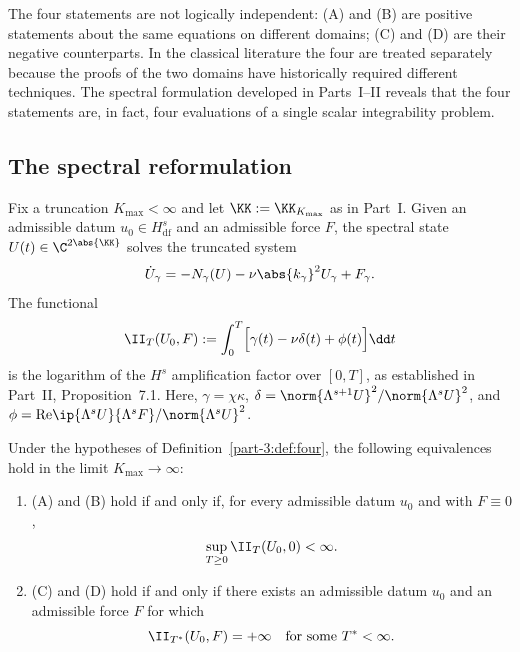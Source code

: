 \begin{remark}\label{part-3:rem:four-structure}
The four statements are not logically independent: (A) and (B) are 
positive statements about the same equations on different domains; 
(C) and (D) are their negative counterparts. In the classical 
literature the four are treated separately because the proofs of the 
two domains have historically required different techniques. The 
spectral formulation developed in Parts~I--II reveals that the four 
statements are, in fact, four evaluations of a single scalar 
integrability problem.
\end{remark}

\subsection{The spectral reformulation}
\label{part-3:ssec:spectral-reform}

Fix a truncation $K_{\max}<\infty$ and let $\KK := \KK_{K_{\max}}$ as 
in Part~I. Given an admissible datum $u_0\in H^s_{\mathrm{df}}$ and 
an admissible force $F$, the spectral state 
$U(t)\in\C^{2\abs{\KK}}$ solves the truncated system
\begin{equation}\label{part-3:eq:spectral-trunc}
\dot U_\gamma = -N_\gamma(U) - \nu\abs{k_\gamma}^2 U_\gamma + F_\gamma.
\end{equation}
The functional
\begin{equation}\label{part-3:eq:master-functional}
\II_{T}(U_0,F) := \int_0^{T}\Bigl[\gamma(t) - \nu\delta(t) + \phi(t)\Bigr]\dd t
\end{equation}
is the logarithm of the $H^s$ amplification factor over $[0,T]$, as 
established in Part~II, Proposition~7.1. Here, $\gamma = \chi\kappa$, 
$\delta = \norm{\Lambda^{s+1}U}^2/\norm{\Lambda^s U}^2$, and 
$\phi = \mathrm{Re}\ip{\Lambda^s U}{\Lambda^s F}/\norm{\Lambda^s U}^2$.

\begin{theorem}\label{part-3:thm:four-spectral}
Under the hypotheses of Definition~\ref{part-3:def:four}, the following 
equivalences hold in the limit $K_{\max}\to\infty$:
\begin{enumerate}[label=(\roman*),leftmargin=*]
\item (A) and (B) hold if and only if, for every admissible datum 
      $u_0$ and with $F\equiv 0$,
      \begin{equation}\label{part-3:eq:A-criterion}
      \sup_{T\geq 0}\II_T(U_0,0) < \infty.
      \end{equation}
\item (C) and (D) hold if and only if there exists an admissible 
      datum $u_0$ and an admissible force $F$ for which
      \begin{equation}\label{part-3:eq:C-criterion}
      \II_{T^\ast}(U_0,F) = +\infty
      \quad\text{for some } T^\ast<\infty.
      \end{equation}
\end{enumerate}
\end{theorem}

